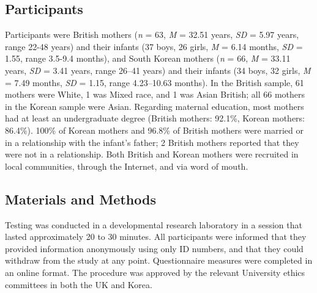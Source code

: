 \documentclass[
]{article}
\begin{document}
\hypertarget{participants}{%
\subsection*{Participants}\label{participants}}

Participants were British mothers (\emph{n} = 63, \emph{M} = 32.51 years, \emph{SD} = 5.97 years, range 22-48 years)
and their infants (37 boys, 26 girls, \emph{M} = 6.14 months, \emph{SD} = 1.55, range 3.5-9.4 months),
and South Korean mothers (\emph{n} = 66, \emph{M} = 33.11 years, \emph{SD} = 3.41 years, range 26--41 years)
and their infants (34 boys, 32 girls, \emph{M} = 7.49 months, \emph{SD} = 1.15, range 4.23--10.63 months).
In the British sample, 61 mothers were White, 1 was Mixed race, and 1 was Asian British;
all 66 mothers in the Korean sample were Asian.
Regarding maternal education, most mothers had at least an undergraduate degree (British mothers: 92.1\%, Korean mothers: 86.4\%).
100\% of Korean mothers and 96.8\% of British mothers were married or in a relationship with the infant's father;
2 British mothers reported that they were not in a relationship.
Both British and Korean mothers were recruited in local communities, through the Internet, and via word of mouth.

\hypertarget{materials-and-methods}{%
\subsection*{Materials and Methods}\label{materials-and-methods}}

Testing was conducted in a developmental research laboratory in a session that lasted approximately 20 to 30 minutes. All participants were informed that they provided information anonymously using only ID numbers, and that they could withdraw from the study at any point. Questionnaire measures were completed in an online format. The procedure was approved by the relevant University ethics committees in both the UK and Korea.
\end{document}
